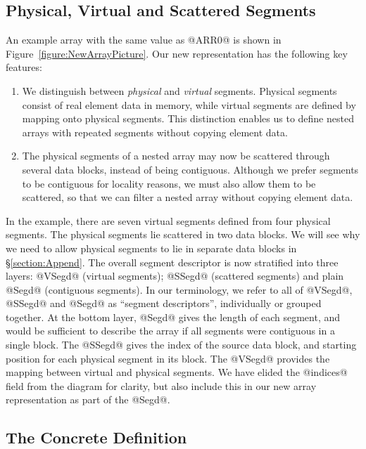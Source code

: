 \subsection{Physical, Virtual and Scattered Segments}
An example array with the same value as @ARR0@ is shown in Figure~\ref{figure:NewArrayPicture}. Our new representation has the following key features:
\begin{enumerate}
\item   We distinguish between \emph{physical} and \emph{virtual} segments. Physical segments consist of real element data in memory, while virtual segments are defined by mapping onto physical segments. This distinction enables us to define nested arrays with repeated segments without copying element data.

\item   The physical segments of a nested array may now be scattered through several data blocks, instead of being contiguous. Although we prefer segments to be contiguous for locality reasons, we must also allow them to be scattered, so that we can filter a nested array without copying element data.
\end{enumerate}
In the example, there are seven virtual segments defined from four physical segments. The physical segments lie scattered in two data blocks. We will see why we need to allow physical segments to lie in separate data blocks in \S\ref{section:Append}. The overall segment descriptor is now stratified into three layers: @VSegd@ (virtual segments); @SSegd@ (scattered segments) and plain @Segd@ (contiguous segments). In our terminology, we refer to all of @VSegd@, @SSegd@ and @Segd@ as ``segment descriptors'', individually or grouped together. At the bottom layer, @Segd@ gives the length of each segment, and would be sufficient to describe the array if all segments were contiguous in a single block. The @SSegd@ gives the index of the source data block, and starting position for each physical segment in its block. The @VSegd@ provides the mapping between virtual and physical segments. We have elided the @indices@ field from the diagram for clarity, but also include this in our new array representation as part of the @Segd@.


\clearpage{}
\subsection{The Concrete Definition}
\label{section:Representation}

